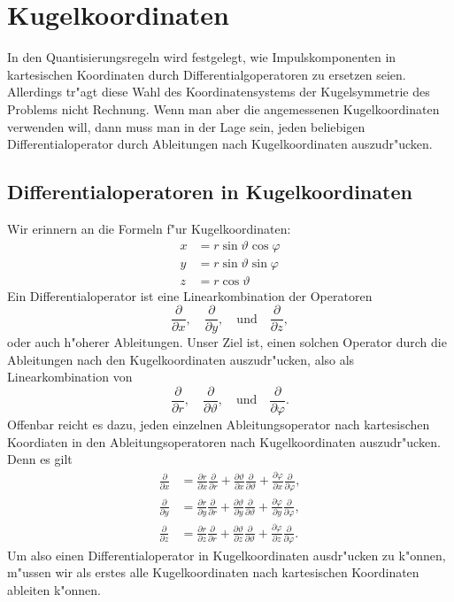 \chapter{Kugelkoordinaten\label{chapter:kugelkoordinaten}}
\rhead{}
In den Quantisierungsregeln wird festgelegt, wie Impulskomponenten
in kartesischen Koordinaten durch Differentialgoperatoren zu
ersetzen seien.
Allerdings tr"agt diese Wahl des Koordinatensystems der Kugelsymmetrie
des Problems nicht Rechnung. 
Wenn man aber die angemessenen Kugelkoordinaten verwenden will,
dann muss man in der Lage sein, jeden beliebigen Differentialoperator
durch Ableitungen nach Kugelkoordinaten auszudr"ucken.

\section{Differentialoperatoren in Kugelkoordinaten}
%
Wir erinnern an die Formeln f"ur Kugelkoordinaten:
\begin{align*}
x&=
r\sin\vartheta\cos\varphi
\\
y&=
r\sin\vartheta\sin\varphi
\\
z&=
r\cos\vartheta
\end{align*}
Ein Differentialoperator ist eine Linearkombination der Operatoren
\[
\frac{\partial}{\partial x},
\quad
\frac{\partial}{\partial y},
\quad\text{und}\quad
\frac{\partial}{\partial z},
\]
oder auch h"oherer Ableitungen.  Unser Ziel ist, einen solchen Operator
durch die Ableitungen nach den Kugelkoordinaten auszudr"ucken, also
als Linearkombination von
\[
\frac{\partial}{\partial r},
\quad
\frac{\partial}{\partial \vartheta},
\quad\text{und}\quad
\frac{\partial}{\partial \varphi}.
\]
Offenbar reicht es dazu, jeden einzelnen Ableitungsoperator nach kartesischen
Koordiaten in den Ableitungsoperatoren nach Kugelkoordinaten auszudr"ucken.
Denn es gilt
\begin{align*}
\frac{\partial}{\partial x}
&=
\frac{\partial r}{\partial x} \frac{\partial}{\partial r}
+
\frac{\partial \vartheta}{\partial x} \frac{\partial}{\partial \vartheta}
+
\frac{\partial \varphi}{\partial x} \frac{\partial}{\partial \varphi},
\\
\frac{\partial}{\partial y}
&=
\frac{\partial r}{\partial y} \frac{\partial}{\partial r}
+
\frac{\partial \vartheta}{\partial y} \frac{\partial}{\partial \vartheta}
+
\frac{\partial \varphi}{\partial y} \frac{\partial}{\partial \varphi},
\\
\frac{\partial}{\partial z}
&=
\frac{\partial r}{\partial z} \frac{\partial}{\partial r}
+
\frac{\partial \vartheta}{\partial z} \frac{\partial}{\partial \vartheta}
+
\frac{\partial \varphi}{\partial z} \frac{\partial}{\partial \varphi}.
\end{align*}
Um also einen Differentialoperator in Kugelkoordinaten ausdr"ucken zu
k"onnen, m"ussen wir als erstes alle Kugelkoordinaten nach kartesischen
Koordinaten ableiten k"onnen.

